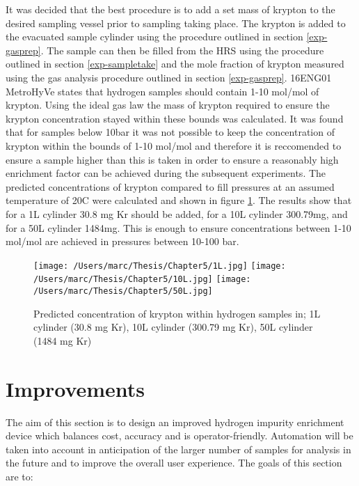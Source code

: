It was decided that the best procedure is to add a set mass of krypton to the desired sampling vessel prior to sampling taking place. The krypton is added to the evacuated sample cylinder using the procedure outlined in section \ref{exp-gasprep}. The sample can then be filled from the HRS using the procedure outlined in section \ref{exp-sampletake} and the mole fraction of krypton measured using the gas analysis procedure outlined in section \ref{exp-gasprep}. 16ENG01 MetroHyVe states that hydrogen samples should contain 1-10 \textmu mol/mol of krypton. Using the ideal gas law the mass of krypton required to ensure the krypton concentration stayed within these bounds was calculated. It was found that for samples below 10bar it was not possible to keep the concentration of krypton within the bounds of 1-10 \textmu mol/mol and therefore it is reccomended to ensure a sample higher than this is taken in order to ensure a reasonably high enrichment factor can be achieved during the subsequent experiments. The predicted concentrations of krypton compared to fill pressures at an assumed temperature of 20\textdegree C were calculated and shown in figure \ref{krsamples}. The results show that for a 1L cylinder 30.8 mg Kr should be added, for a 10L cylinder 300.79mg, and for a 50L cylinder 1484mg. This is enough to ensure concentrations between 1-10 \textmu mol/mol are achieved in pressures between 10-100 bar. 

\begin{figure}[H]
    \centering
    \texttt{[image: /Users/marc/Thesis/Chapter5/1L.jpg]}
    \texttt{[image: /Users/marc/Thesis/Chapter5/10L.jpg]}
    \texttt{[image: /Users/marc/Thesis/Chapter5/50L.jpg]}
    \caption{Predicted concentration of krypton within hydrogen samples in; 1L cylinder (30.8 mg Kr), 10L cylinder (300.79 mg Kr), 50L cylinder (1484 mg Kr)}
    \label{krsamples}
  \end{figure}

\section{Improvements}
The aim of this section is to design an improved hydrogen impurity enrichment device which balances cost, accuracy and is operator-friendly. Automation will be taken into account in anticipation of the larger number of samples for analysis in the future and to improve the overall user experience. The goals of this section are to:

